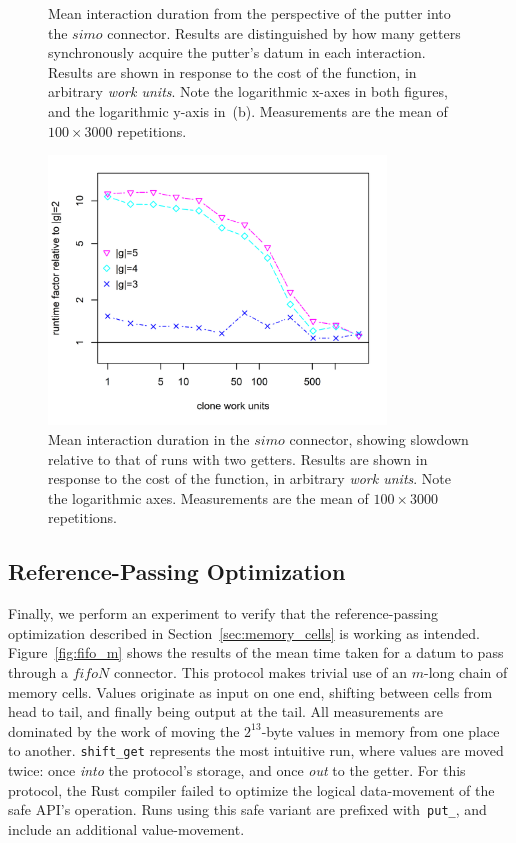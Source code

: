 \begin{figure}
{\begin{subfigure}[b]{0.63\textwidth}
			\caption{}
			\label{fig:simo_1}
		\end{subfigure}%
	}
	\caption[Interaction duration with parallel getters.]{Mean interaction duration from the perspective of the putter into the $simo$ connector. Results are distinguished by how many getters synchronously acquire the putter's datum in each interaction. Results are shown in response to the cost of the  function, in arbitrary \textit{work units}. Note the logarithmic x-axes in both figures, and the logarithmic y-axis in~(b). Measurements are the mean of $100\times{}3000$ repetitions.}
	\label{fig:simo}
\end{figure}


\begin{figure}
	\centering
	\includegraphics[width=0.80\textwidth]{experiments/simo_2.png}
	\caption[Interaction duration in proportion to the 2-getter case.]{Mean interaction duration in the $simo$ connector, showing slowdown relative to that of runs with two getters. Results are shown in response to the cost of the  function, in arbitrary \textit{work units}. Note the logarithmic axes. Measurements are the mean of $100\times{}3000$ repetitions.}
	\label{fig:simo_2}
\end{figure}

\subsection{Reference-Passing Optimization}
Finally, we perform an experiment to verify that the reference-passing optimization described in Section~\ref{sec:memory_cells} is working as intended. Figure~\ref{fig:fifo_m} shows the results of the mean time taken for a datum to pass through a $fifoN$ connector. This protocol makes trivial use of an $m$-long chain of memory cells. Values originate as input on one end, shifting between cells from head to tail, and finally being output at the tail. All measurements are dominated by the work of moving the $2^{13}$-byte values in memory from one place to another. \texttt{shift\_get} represents the most intuitive run, where values are moved twice: once \textit{into} the protocol's storage, and once \textit{out} to the getter. For this protocol, the Rust compiler failed to optimize the logical data-movement of the safe API's  operation. Runs using this safe variant are prefixed with~\texttt{put\_}, and include an additional value-movement.

